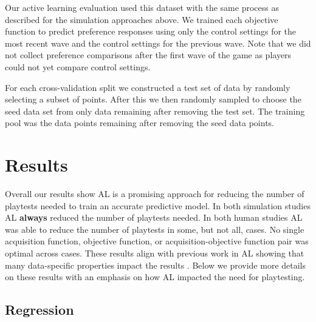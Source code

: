 \documentclass{sig-alternate}
\begin{document}

Our active learning evaluation used this dataset with the same process as described for the simulation approaches above.
We trained each objective function to predict preference responses using only the control settings for the most recent wave and the control settings for the previous wave.
Note that we did not collect preference comparisons after the first wave of the game as players could not yet compare control settings.

For each cross-validation split we constructed a test set of data by randomly selecting a subset of points.
After this we then randomly sampled to choose the seed data set from only data remaining after removing the test set.
The training pool was the data points remaining after removing the seed data points.



\section{Results}

Overall our results show AL is a promising approach for reducing the number of playtests needed to train an accurate predictive model.
In both simulation studies AL \textbf{always} reduced the number of playtests needed. %
In both human studies AL was able to reduce the number of playtests in some, but not all, cases.
No single acquisition function, objective function, or acquisition-objective function pair was optimal across cases.
These results align with previous work in AL showing that many data-specific properties impact the results \cite{schein2007:al-logreg-eval}.
Below we provide more details on these results with an emphasis on how AL impacted the need for playtesting.


\subsection{Regression}
\end{document}
